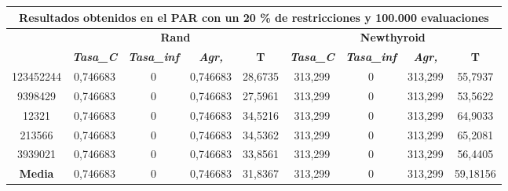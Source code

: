 \documentclass[12pt, spanish]{article}
\begin{document}
\begin{table}[H]
\begin{tabular}{|c|c|c|c|c|c|c|c|c|}
\hline
\multicolumn{9}{|c|}{\textbf{Resultados obtenidos en el PAR con un 20 \% de restricciones y 100.000 evaluaciones}}                                                                                                \\ \hline
\multirow{2}{*}{} & \multicolumn{4}{c|}{\textbf{Rand}}                                                            & \multicolumn{4}{c|}{\textbf{Newthyroid}}                                                      \\ \cline{2-9} 
                  & \textit{\textbf{Tasa\_C}} & \textit{\textbf{Tasa\_inf}} & \textit{\textbf{Agr,}} & \textbf{T} & \textit{\textbf{Tasa\_C}} & \textit{\textbf{Tasa\_inf}} & \textit{\textbf{Agr,}} & \textbf{T} \\ \hline
123452244         & 0,746683                  & 0                           & 0,746683               & 28,6735    & 313,299                   & 0                           & 313,299                & 55,7937    \\ \hline
9398429           & 0,746683                  & 0                           & 0,746683               & 27,5961    & 313,299                   & 0                           & 313,299                & 53,5622    \\ \hline
12321             & 0,746683                  & 0                           & 0,746683               & 34,5216    & 313,299                   & 0                           & 313,299                & 64,9033    \\ \hline
213566            & 0,746683                  & 0                           & 0,746683               & 34,5362    & 313,299                   & 0                           & 313,299                & 65,2081    \\ \hline
3939021           & 0,746683                  & 0                           & 0,746683               & 33,8561    & 313,299                   & 0                           & 313,299                & 56,4405    \\ \hline
\textbf{Media}    & 0,746683                  & 0                           & 0,746683               & 31,8367    & 313,299                   & 0                           & 313,299                & 59,18156   \\ \hline
\end{tabular}
\end{table}
\end{document}
